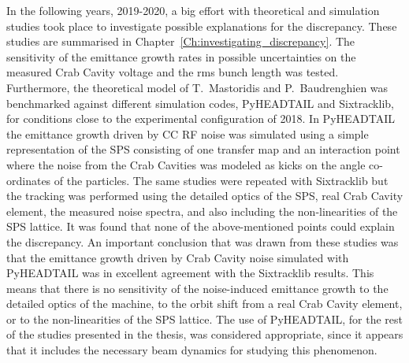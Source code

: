 In the following years, 2019-2020, a big effort with theoretical and simulation studies took place to investigate possible explanations for the discrepancy. These studies are summarised in Chapter~\ref{Ch:investigating_discrepancy}. The sensitivity of the emittance growth rates in possible uncertainties on the measured Crab Cavity voltage and the rms bunch length was tested. Furthermore, the theoretical model of T.~Mastoridis and P.~Baudrenghien was benchmarked against different simulation codes, PyHEADTAIL and Sixtracklib, for conditions close to the experimental configuration of 2018. In PyHEADTAIL the emittance growth driven by CC RF noise was simulated using a simple representation of the SPS consisting of one transfer map and an interaction point where the noise from the Crab Cavities was modeled as kicks on the angle co-ordinates of the particles. The same studies were repeated with Sixtracklib but the tracking was performed using the detailed optics of the SPS, real Crab Cavity element, the measured noise spectra, and also including the non-linearities of the SPS lattice. It was found that none of the above-mentioned points could explain the discrepancy. An important conclusion that was drawn from these studies was that the emittance growth driven by Crab Cavity noise simulated with PyHEADTAIL was in excellent agreement with the Sixtracklib results. This means that there is no sensitivity of the noise-induced emittance growth to the detailed optics of the machine, to the orbit shift from a real Crab Cavity element, or to the non-linearities of the SPS lattice. The use of PyHEADTAIL, for the rest of the studies presented in the thesis, was considered appropriate, since it appears that it includes the necessary beam dynamics for studying this phenomenon.

